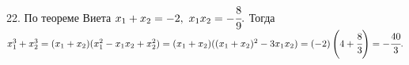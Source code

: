 22. По теореме Виета $x_1+x_2=-2,\ x_1x_2=-\cfrac{8}{9}.$ Тогда $x_1^3+x_2^3=(x_1+x_2)(x_1^2-x_1x_2+x_2^2)=(x_1+x_2)((x_1+x_2)^2-3x_1x_2)=(-2)\left(4+\cfrac{8}{3}\right)=-\cfrac{40}{3}.$\\
